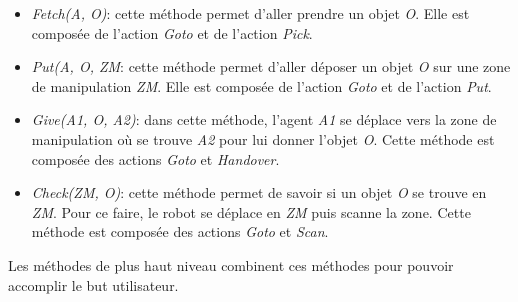 \documentclass[a4paper,11pt,twoside]{StyleThese}
\begin{document}
 \begin{itemize}

\item \textit{Fetch(A, O)}: cette méthode permet d'aller prendre un objet \textit{O}. Elle est composée de l'action \textit{Goto} et de l'action \textit{Pick}.

\item \textit{Put(A, O, ZM}: cette méthode permet d'aller déposer un objet \textit{O} sur une zone de manipulation \textit{ZM}. Elle est composée de l'action \textit{Goto} et de l'action \textit{Put}.

\item \textit{Give(A1, O, A2)}: dans cette méthode, l'agent \textit{A1} se déplace vers la zone de manipulation où se trouve \textit{A2} pour lui donner l'objet \textit{O}. Cette méthode est composée des actions \textit{Goto} et \textit{Handover}.

\item \textit{Check(ZM, O)}: cette méthode permet de savoir si un objet \textit{O} se trouve en \textit{ZM}. Pour ce faire, le robot se déplace en \textit{ZM} puis scanne la zone. Cette méthode est composée des actions \textit{Goto} et \textit{Scan}.

\end{itemize}

Les méthodes de plus haut niveau combinent ces méthodes pour pouvoir accomplir le but utilisateur.
\end{document}
